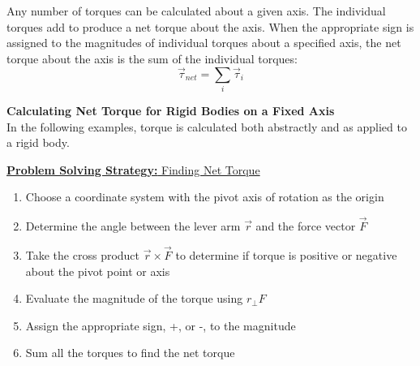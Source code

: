 \documentclass[a4paper]{article}
\let\bf\textbf
\begin{document}
Any number of torques can be calculated about a given axis. The individual torques add to produce a net torque about the axis. When the appropriate sign is assigned to the magnitudes of individual torques about a specified axis, the net torque about the axis is the sum of the individual torques:
\begin{equation}
    \vec{\tau}_{net} = \sum_{i}\vec{\tau}_i
\end{equation}

\newpage\noindent
\bf{Calculating Net Torque for Rigid Bodies on a Fixed Axis}
\vspace{2mm}\\
In the following examples, torque is calculated both abstractly and as applied to a rigid body.
\begin{shaded}
    \underline{\bf{Problem Solving Strategy:} Finding Net Torque}
    \begin{enumerate}
        \item Choose a coordinate system with the pivot axis of rotation as the origin
        \item Determine the angle between the lever arm $\vec{r}$ and the force vector $\vec{F}$
        \item Take the cross product $\vec{r}\times\vec{F}$ to determine if torque is positive or negative about the pivot point or axis 
        \item Evaluate the magnitude of the torque using $r_{\perp}F$
        \item Assign the appropriate sign, +, or -, to the magnitude
        \item Sum all the torques to find the net torque
    \end{enumerate}
\end{shaded}
\end{document}

